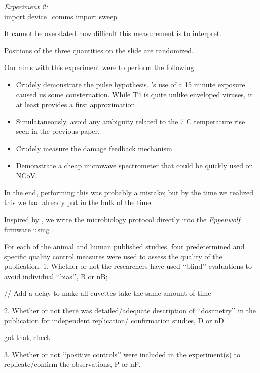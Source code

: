 \documentclass[paper.tex]{subfiles}%
\begin{document}
\clearpage
{\Large \it Experiment 2:}\\



\endmoddef\nwstartdeflinemarkup\nwenddeflinemarkup
import device_comms
import sweep

\nwendcode{}\nwdocspar


It cannot be overstated how difficult this measurement is to interpret.

Positions of the three quantities on the slide are randomized\cite{first2000}.


Our aims with this experiment were to perform the following:

\begin{itemize}
\item Crudely demonstrate the pulse hypothesis. \cite{Efficient2015}'s use of a 15 minute exposure caused us some consternation.
    While T4 is quite unlike enveloped viruses, it at least provides a first approximation.
\item Simulataneously, avoid any ambiguity related to the 7 C temperature rise seen in the previous paper.
\item Crudely measure the damage feedback mechanism.
\item Demonstrate a cheap microwave spectrometer that could be quickly used on NCoV.
\end{itemize}

In the end, performing this was probably a mistake; but by the time we realized this we had already put in the bulk of the time.

Inspired by \cite{Biocoder2010}, we write the microbiology protocol directly into the {\it Eppenwolf} firmware using \cite{Noweb}.

For each of the animal and human published studies, four
predetermined and specific quality control measures were used to
assess the quality of the publication.
1. Whether or not the researchers have used ‘‘blind’’ evaluations to
avoid individual ‘‘bias’’, B or nB;

// Add a delay to make all cuvettes take the same amount of time

2. Whether or not there was detailed/adequate description of
‘‘dosimetry’’ in the publication for independent replication/
confirmation studies, D or nD.

got that, check

3. Whether or not ‘‘positive controls’’ were included in the
experiment(s) to replicate/confirm the observations, P or nP.
\end{document}

